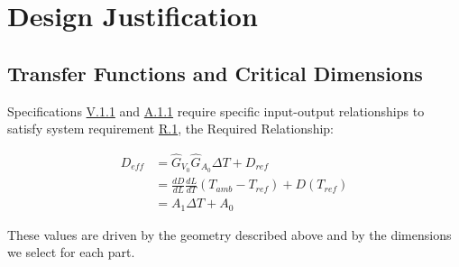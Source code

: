 \documentclass[12pt, letterpaper]{report}%
\newcounter{mycounter}           %
\newcounter{sub}[mycounter]      %
\newcommand{\RRfull}
{
	\begin{equation}
		\begin{aligned}
			D_{eff} &= \hat{G}_{V_0} \hat{G}_{A_0} \Delta T + D_{ref} \\
			&= \frac{dD}{dL} \frac{dL}{dT} (T_{amb} - T_{ref}) + D(T_{ref}) \\
			&= A_1 \Delta T + A_0
		\end{aligned}
	\end{equation}
}
\newcommand{\specref}[1]{\hyperref[tab:specs]{#1}}
\begin{document}
	\section{Design Justification}
	\label{sec:design:just}

		\subsection{Transfer Functions and Critical Dimensions}
		\label{subsec:design:just:TF}

			Specifications \specref{V.1.1} and \specref{A.1.1} require specific input-output relationships to satisfy system requirement \specref{R.1}, the Required Relationship:

			\RRfull

			These values are driven by the geometry described above and by the dimensions we select for each part.
\end{document}
